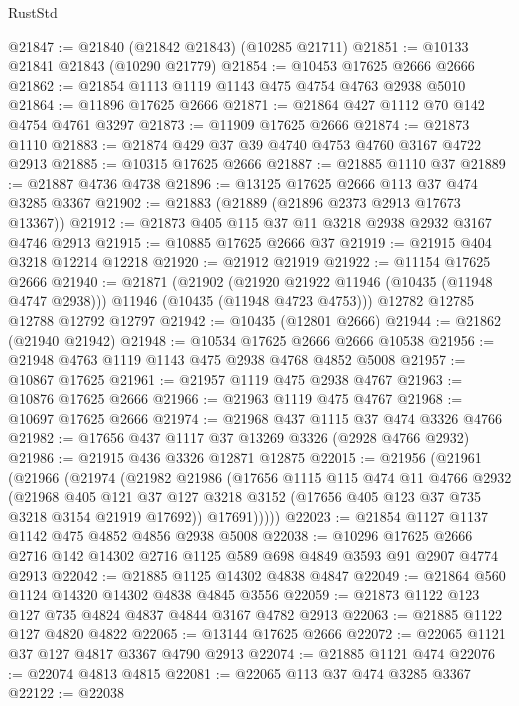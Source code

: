 \begin{lexlean}{RustStd}
\begin{coremodule}
@21847 := @21840 (@21842 @21843) (@10285 @21711)
@21851 := @10133 @21841 @21843 (@10290 @21779)
@21854 := @10453 @17625 @2666 @2666
@21862 := @21854 @1113 @1119 @1143 @475 @4754 @4763 @2938 @5010
@21864 := @11896 @17625 @2666
@21871 := @21864 @427 @1112 @70 @142 @4754 @4761 @3297
@21873 := @11909 @17625 @2666
@21874 := @21873 @1110
@21883 := @21874 @429 @37 @39 @4740 @4753 @4760 @3167 @4722 @2913
@21885 := @10315 @17625 @2666
@21887 := @21885 @1110 @37
@21889 := @21887 @4736 @4738
@21896 := @13125 @17625 @2666 @113 @37 @474 @3285 @3367
@21902 := @21883 (@21889 (@21896 @2373 @2913 @17673 @13367))
@21912 := @21873 @405 @115 @37 @11 @3218 @2938 @2932 @3167 @4746 @2913
@21915 := @10885 @17625 @2666 @37
@21919 := @21915 @404 @3218 @12214 @12218
@21920 := @21912 @21919
@21922 := @11154 @17625 @2666
@21940 := @21871
    (@21902
      (@21920 @21922 @11946 (@10435 (@11948 @4747 @2938)))
      @11946
      (@10435 (@11948 @4723 @4753)))
    @12782
    @12785
    @12788
    @12792
    @12797
@21942 := @10435 (@12801 @2666)
@21944 := @21862 (@21940 @21942)
@21948 := @10534 @17625 @2666 @2666 @10538
@21956 := @21948 @4763 @1119 @1143 @475 @2938 @4768 @4852 @5008
@21957 := @10867 @17625
@21961 := @21957 @1119 @475 @2938 @4767
@21963 := @10876 @17625 @2666
@21966 := @21963 @1119 @475 @4767
@21968 := @10697 @17625 @2666
@21974 := @21968 @437 @1115 @37 @474 @3326 @4766
@21982 := @17656 @437 @1117 @37 @13269 @3326 (@2928 @4766 @2932)
@21986 := @21915 @436 @3326 @12871 @12875
@22015 := @21956
    (@21961
      (@21966
        (@21974
          (@21982
            @21986
            (@17656
              @1115
              @115
              @474
              @11
              @4766
              @2932
              (@21968
                @405
                @121
                @37
                @127
                @3218
                @3152
                (@17656 @405 @123 @37 @735 @3218 @3154 @21919 @17692))
              @17691)))))
@22023 := @21854 @1127 @1137 @1142 @475 @4852 @4856 @2938 @5008
@22038 := @10296
    @17625
    @2666
    @2716
    @142
    @14302
    @2716
    @1125
    @589
    @698
    @4849
    @3593
    @91
    @2907
    @4774
    @2913
@22042 := @21885 @1125 @14302 @4838 @4847
@22049 := @21864 @560 @1124 @14320 @14302 @4838 @4845 @3556
@22059 := @21873 @1122 @123 @127 @735 @4824 @4837 @4844 @3167 @4782 @2913
@22063 := @21885 @1122 @127 @4820 @4822
@22065 := @13144 @17625 @2666
@22072 := @22065 @1121 @37 @127 @4817 @3367 @4790 @2913
@22074 := @21885 @1121 @474
@22076 := @22074 @4813 @4815
@22081 := @22065 @113 @37 @474 @3285 @3367
@22122 := @22038

\end{coremodule}
\end{lexlean}
